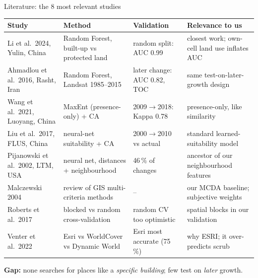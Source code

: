 \documentclass[aspectratio=169,11pt]{beamer}
\begin{document}
\begin{frame}{Literature: the 8 most relevant studies}
  \vspace{-0.6em}
  \scriptsize
  \renewcommand{\arraystretch}{1.0}
  \setlength{\tabcolsep}{4pt}
  \begin{tabularx}{\textwidth}{@{}L{2.75cm} Y L{2.8cm} L{3.9cm}@{}}
    \toprule
    \textbf{Study} & \textbf{Method} & \textbf{Validation} & \textbf{Relevance to us} \\
    \midrule
    Li et al.\ 2024, Yulin, China & Random Forest, built-up vs protected land & random split: AUC 0.99 & closest work; own-cell land use inflates AUC \\
    Ahmadlou et al.\ 2016, Rasht, Iran & Random Forest, Landsat 1985--2015 & later change: AUC 0.82, TOC & same test-on-later-growth design \\
    Wang et al.\ 2021, Luoyang, China & MaxEnt (presence-only) + CA & 2009$\rightarrow$2018: Kappa 0.78 & presence-only, like similarity \\
    Liu et al.\ 2017, FLUS, China & neural-net suitability + CA & 2000$\rightarrow$2010 vs actual & standard learned-suitability model \\
    Pijanowski et al.\ 2002, LTM, USA & neural net, distances + neighbourhood & 46\,\% of changes & ancestor of our neighbourhood features \\
    Malczewski 2004 & review of GIS multi-criteria methods & -- & our MCDA baseline; subjective weights \\
    Roberts et al.\ 2017 & blocked vs random cross-validation & random CV too optimistic & spatial blocks in our validation \\
    Venter et al.\ 2022 & Esri vs WorldCover vs Dynamic World & Esri most accurate (75\,\%) & why ESRI; it over-predicts scrub \\
    \bottomrule
  \end{tabularx}
  \vspace{0.3em}

  \footnotesize\textbf{Gap:} none searches for places like a \emph{specific building}; few test on \emph{later} growth.
\end{frame}
\end{document}
